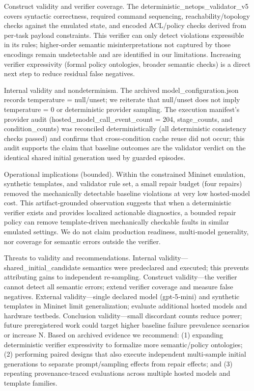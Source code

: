\documentclass[conference]{IEEEtran}
\begin{document}
Construct validity and verifier coverage. The deterministic\_netops\_validator\_v5 covers syntactic correctness, required command sequencing, reachability/topology checks against the emulated state, and encoded ACL/policy checks derived from per‑task payload constraints. This verifier can only detect violations expressible in its rules; higher‑order semantic misinterpretations not captured by those encodings remain undetectable and are identified in our limitations. Increasing verifier expressivity (formal policy ontologies, broader semantic checks) is a direct next step to reduce residual false negatives.

Internal validity and nondeterminism. The archived model\_configuration.json records temperature = null/unset; we reiterate that null/unset does not imply temperature = 0 or deterministic provider sampling. The execution manifest's provider audit (hosted\_model\_call\_event\_count = 204, stage\_counts, and condition\_counts) was reconciled deterministically (all deterministic consistency checks passed) and confirms that cross‑condition cache reuse did not occur; this audit supports the claim that baseline outcomes are the validator verdict on the identical shared initial generation used by guarded episodes.

Operational implications (bounded). Within the constrained Mininet emulation, synthetic templates, and validator rule set, a small repair budget (four repairs) removed the mechanically detectable baseline violations at very low hosted‑model cost. This artifact‑grounded observation suggests that when a deterministic verifier exists and provides localized actionable diagnostics, a bounded repair policy can remove template‑driven mechanically checkable faults in similar emulated settings. We do not claim production readiness, multi‑model generality, nor coverage for semantic errors outside the verifier.

Threats to validity and recommendations. Internal validity---shared\_initial\_candidate semantics were predeclared and executed; this prevents attributing gains to independent re‑sampling. Construct validity---the verifier cannot detect all semantic errors; extend verifier coverage and measure false negatives. External validity---single declared model (gpt‑5‑mini) and synthetic templates in Mininet limit generalization; evaluate additional hosted models and hardware testbeds. Conclusion validity---small discordant counts reduce power; future preregistered work could target higher baseline failure prevalence scenarios or increase N. Based on archived evidence we recommend: (1) expanding deterministic verifier expressivity to formalize more semantic/policy ontologies; (2) performing paired designs that also execute independent multi‑sample initial generations to separate prompt/sampling effects from repair effects; and (3) repeating provenance‑traced evaluations across multiple hosted models and template families.
\end{document}
